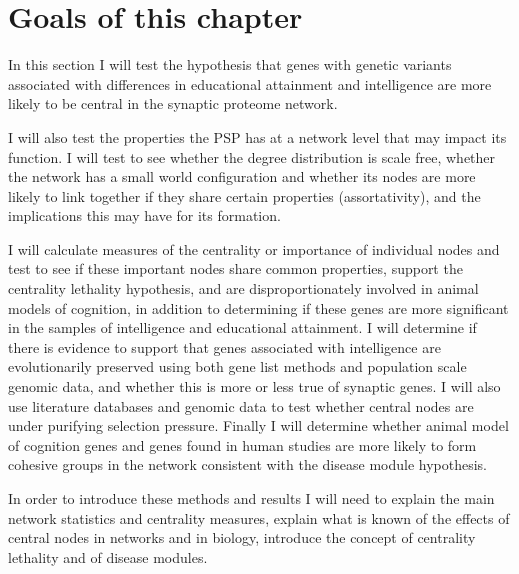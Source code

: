 \section{Goals of this chapter}

In this section I will test the hypothesis that genes with genetic variants associated with differences in educational attainment and intelligence are more likely to be central in the synaptic proteome network.

I will also test the properties the PSP has at a network level that may impact its function. I will test to see whether the degree distribution is scale free, whether the network has a small world configuration and whether its nodes are more likely to link together if they share certain properties (assortativity), and the implications this may have for its formation. 

I will calculate measures of the centrality or importance of individual nodes and test to see if these important nodes share common properties, support the centrality lethality hypothesis, and are disproportionately involved in animal models of cognition, in addition to determining if these genes are more significant in the samples of intelligence and educational attainment. I will determine if there is evidence to support that genes associated with intelligence are evolutionarily preserved using both gene list methods and population scale genomic data, and whether this is more or less true of synaptic genes. I will also use literature databases and genomic data to test whether central nodes are under purifying selection pressure. Finally I will determine whether animal model of cognition genes and genes found in human studies are more likely to form cohesive groups in the network consistent with the disease module hypothesis. 

In order to introduce these methods and results I will need to explain the main network statistics and centrality measures, explain what is known of the effects of central nodes in networks and in biology, introduce the concept of centrality lethality and of disease modules. 

